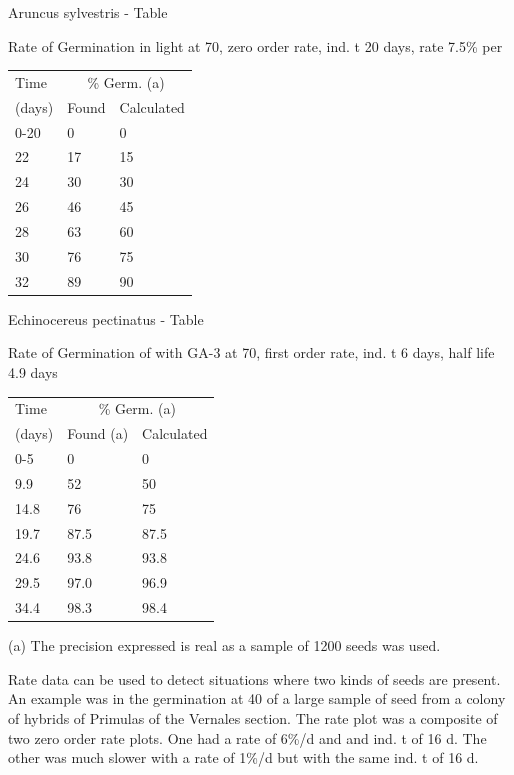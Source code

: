 \begin{table}[h!]
\begin{center}
Aruncus sylvestris - Table \thetable

Rate of Germination in light at 70,
zero order rate, ind. t 20 days,
rate 7.5\% per
\end{center}

\begin{tabular}{lll}
\hline
Time      & \multicolumn{2}{c}{\% Germ. (a)} \\
(days)    & Found & Calculated \\
\hline
0-20 & 0 &  0 \\
22 & 17 & 15 \\
24 & 30 & 30 \\
26 & 46 & 45 \\
28 & 63 & 60 \\
30 & 76 & 75 \\
32 & 89 & 90 \\
\hline
\end{tabular}
\end{table}

\begin{table}[h!]
\begin{center}
Echinocereus pectinatus - Table \thetable

Rate of Germination of with GA-3 at
70, first order rate, ind. t 6 days,
half life 4.9 days
\end{center}

\begin{tabular}{lll}
\hline
Time      & \multicolumn{2}{c}{\% Germ. (a)} \\
(days)    & Found (a) & Calculated \\
\hline
0-5 & 0 & 0 \\
9.9 & 52 & 50 \\
14.8 & 76 & 75 \\
19.7 & 87.5 & 87.5 \\
24.6 & 93.8 & 93.8 \\
29.5 & 97.0 & 96.9 \\
34.4 & 98.3 & 98.4 \\
\hline
\end{tabular}

\hfil

(a) The precision expressed is real as a sample of 1200 seeds was used.
\end{table}

Rate data can be used to detect situations where two kinds of seeds are
present. An example was in the germination at 40 of a large sample of seed from a
colony of hybrids of Primulas of the Vernales section. The rate plot was a composite of
two zero order rate plots. One had a rate of 6\%/d and and ind. t of 16 d. The other was
much slower with a rate of 1\%/d but with the same ind. t of 16 d.

